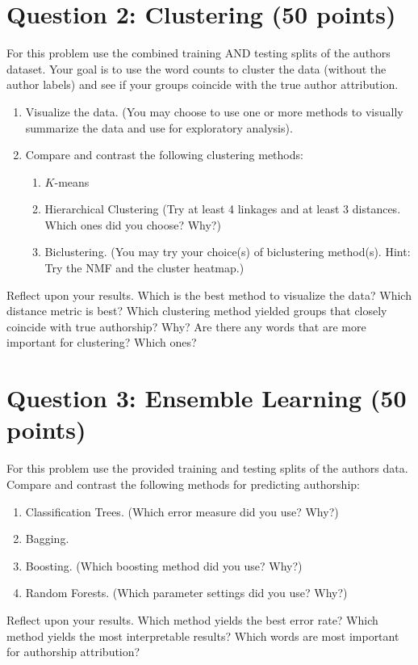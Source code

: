 \documentclass[10pt]{article}
\begin{document}
\section*{Question 2: Clustering (50 points)}

For this problem use the combined training AND testing splits of the \textsf{authors} dataset. Your goal is to use the word counts to cluster the data (without the author labels) and see if your groups coincide with the true author attribution.

\begin{enumerate}[label={(\alph*)}]
\item Visualize the data. (You may choose to use one or more methods to visually summarize the data and use for exploratory analysis).
\item Compare and contrast the following clustering methods:
\begin{enumerate}[label={\roman*.}]
\item $K$-means
\item Hierarchical Clustering (Try at least 4 linkages and at least 3
distances. Which ones did you choose? Why?)
\item Biclustering. (You may try your choice(s) of biclustering
method(s). Hint: Try the NMF and the cluster heatmap.)
\end{enumerate}
\end{enumerate}
Reflect upon your results. Which is the best method to visualize the data? Which distance metric is best? Which clustering method yielded groups that closely coincide with true authorship? Why? Are there any words that are more important for clustering? Which ones?

\section*{Question 3: Ensemble Learning (50 points)}

For this problem use the provided training and testing splits of the \textsf{authors} data. Compare and contrast the following methods for predicting authorship:
\begin{enumerate}
\item Classification Trees. (Which error measure did you use? Why?)
\item Bagging.
\item Boosting. (Which boosting method did you use? Why?)
\item Random Forests. (Which parameter settings did you use? Why?)
\end{enumerate}
Reflect upon your results. Which method yields the best error rate? Which method yields the most interpretable results? Which words are most important for authorship attribution?
\end{document}
